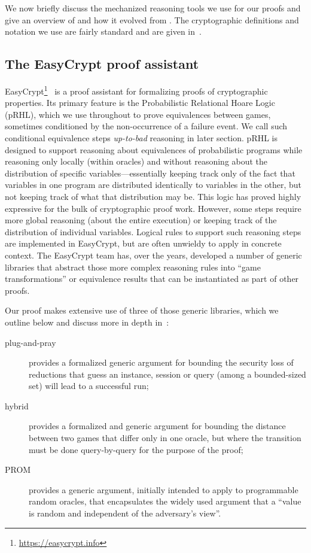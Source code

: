 
We now briefly discuss the mechanized reasoning tools we use for our 
proofs and give an overview of \mlkem and how it evolved from \kyber.
The cryptographic definitions and notation we use are fairly standard
and are given in~\cite{fullversion}.

\subsection{The EasyCrypt proof assistant}
\label{subsec:easycrypt}

EasyCrypt\footnote{\url{https://easycrypt.info}}~\cite{Barthe2014} is a proof
assistant for formalizing proofs of cryptographic properties.
Its primary feature is the Probabilistic Relational Hoare Logic (pRHL), which
we use throughout to prove equivalences between games, sometimes conditioned by
the non-occurrence of a failure event. We call such conditional equivalence
steps \emph{up-to-bad} reasoning in later section.
pRHL is designed to support reasoning about equivalences of probabilistic
programs while reasoning only locally (within oracles) and without reasoning
about the distribution of specific variables---essentially keeping track only
of the fact that variables in one program are distributed identically to
variables in the other, but not keeping track of what that distribution may be.
This logic has proved highly expressive for the bulk of cryptographic proof
work. However, some steps require more global reasoning (about the entire
execution) or keeping track of the distribution of individual variables. 
Logical rules to support such reasoning steps are implemented in EasyCrypt, but
are often unwieldy to apply in concrete context. The EasyCrypt team has, over
the years, developed a number of generic libraries that abstract those more
complex reasoning rules into ``game transformations'' or equivalence results
that can be instantiated as part of other proofs.

Our proof makes extensive use of three of those generic libraries, which we
outline below and discuss more in depth 
in~\cite{fullversion}:
\begin{description}
  \item[plug-and-pray] provides a formalized generic argument for bounding the
    security loss of reductions that guess an instance, session or query (among
    a bounded-sized set) will lead to a successful run;
  \item[hybrid] provides a formalized and generic argument for bounding the
    distance between two games that differ only in one oracle, but where the
    transition must be done query-by-query for the purpose of the proof;
  \item[PROM] provides a generic argument, initially intended to apply to
    programmable random oracles, that encapsulates the widely used argument
    that a ``value is random and independent of the adversary's view''.
\end{description}

